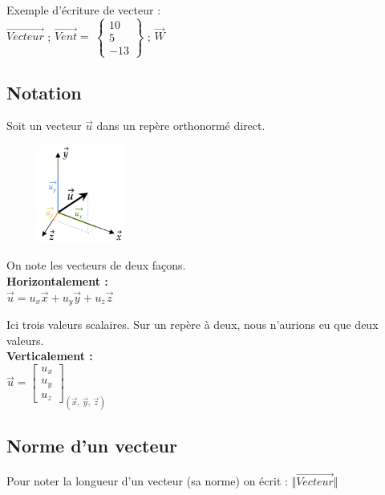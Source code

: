\documentclass[
	11pt, %
	fleqn, %
	a4paper, %
]{LegrandOrangeBook}
\begin{document}
Exemple d'écriture de vecteur : \\
$\overrightarrow{Vecteur}$ ;  $\overrightarrow{Vent}=\ \begin{Bmatrix} 10\\ 5 \\ -13 \end{Bmatrix} $ ; $\overrightarrow{W}$


\subsection{Notation}
Soit un vecteur $\Vec{u}$ dans un repère orthonormé direct.


\begin{figure} %
    \centering
    \includegraphics[width=0.25\textwidth]{Images/not1.png}
\end{figure}

On note les vecteurs de deux façons. \\


\textbf{Horizontalement :} \\


$\Vec{u}= u_x \Vec{x} + u_y \Vec{y} + u_z \Vec{z} $

Ici trois valeurs scalaires. Sur un repère à deux, nous n'aurions eu que deux valeurs. \\

\textbf{Verticalement :} \\

$\vec{u} =\begin{bmatrix}
u_{x}\\
u_{y}\\
u_{z}
\end{bmatrix}_{(\vec{x} ,\ \vec{y} ,\ \vec{z})}$






\subsection{Norme d'un vecteur}
Pour noter la longueur d'un vecteur (sa norme) on écrit : $\Vert \overrightarrow{Vecteur}\Vert \ $
\end{document}
